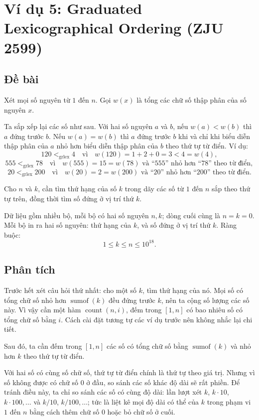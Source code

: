 \documentclass[11pt]{article}
\newcommand{\grlex}{\mathrel{<_{\mathrm{grlex}}}}
\begin{document}
\section{Ví dụ 5: Graduated Lexicographical Ordering (ZJU 2599)}

\subsection{Đề bài}

Xét mọi số nguyên từ $1$ đến $n$. Gọi $w(x)$ là tổng các chữ số thập phân của
số nguyên $x$.

Ta sắp xếp lại các số như sau. Với hai số nguyên $a$ và $b$, nếu
$w(a)<w(b)$ thì $a$ đứng trước $b$. Nếu $w(a)=w(b)$ thì $a$ đứng trước $b$ khi
và chỉ khi biểu diễn thập phân của $a$ nhỏ hơn biểu diễn thập phân của $b$
theo thứ tự từ điển. Ví dụ:
\[
  120\grlex 4
  \quad\text{vì}\quad
  w(120)=1+2+0=3<4=w(4),
\]
\[
  555\grlex 78
  \quad\text{vì}\quad
  w(555)=15=w(78)
  \text{ và ``555'' nhỏ hơn ``78'' theo từ điển},
\]
\[
  20\grlex 200
  \quad\text{vì}\quad
  w(20)=2=w(200)
  \text{ và ``20'' nhỏ hơn ``200'' theo từ điển}.
\]

Cho $n$ và $k$, cần tìm thứ hạng của số $k$ trong dãy các số từ $1$ đến $n$
sắp theo thứ tự trên, đồng thời tìm số đứng ở vị trí thứ $k$.

Dữ liệu gồm nhiều bộ, mỗi bộ có hai số nguyên $n,k$; dòng cuối cùng là
$n=k=0$. Mỗi bộ in ra hai số nguyên: thứ hạng của $k$, và số đứng ở vị trí
thứ $k$. Ràng buộc:
\[
  1\le k\le n\le 10^{18}.
\]

\subsection{Phân tích}

Trước hết xét câu hỏi thứ nhất: cho một số $k$, tìm thứ hạng của nó. Mọi số có
tổng chữ số nhỏ hơn $\operatorname{sumof}(k)$ đều đứng trước $k$, nên ta cộng
số lượng các số này.
Vì vậy cần một hàm $\operatorname{count}(n,i)$, đếm trong $[1,n]$ có bao nhiêu
số có tổng chữ số bằng $i$. Cách cài đặt tương tự các ví dụ trước nên không
nhắc lại chi tiết.

Sau đó, ta cần đếm trong $[1,n]$ các số có tổng chữ số bằng
$\operatorname{sumof}(k)$ và nhỏ hơn $k$ theo thứ tự từ điển.

Với hai số có cùng số chữ số, thứ tự từ điển chính là thứ tự theo giá trị.
Nhưng vì số không được có chữ số $0$ ở đầu, so sánh các số khác độ dài sẽ rất
phiền. Để tránh điều này, ta chỉ so sánh các số có cùng độ dài: lần lượt xét
$k$, $k\cdot 10$, $k\cdot 100,\ldots$ và $k/10$, $k/100,\ldots$; tức là liệt
kê mọi độ dài có thể của $k$ trong phạm vi $1$ đến $n$ bằng cách thêm chữ số
$0$ hoặc bỏ chữ số ở cuối.
\end{document}
